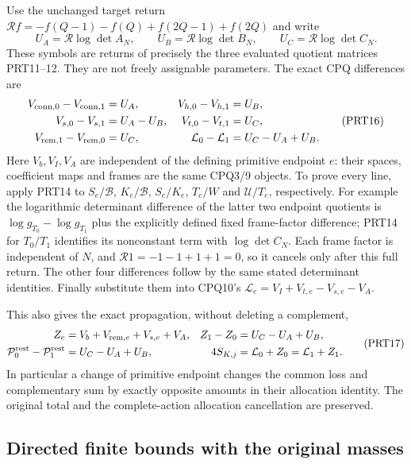 \documentclass[11pt,a4paper]{article}
\begin{document}
Use the unchanged target return
$\mathcal Rf=-f(Q-1)-f(Q)+f(2Q-1)+f(2Q)$ and write
\[
 U_A=\mathcal R\log\det A_N,\qquad
 U_B=\mathcal R\log\det B_N,\qquad
 U_C=\mathcal R\log\det C_N.
 \tag{PRT15}
\]
These symbols are returns of precisely the three evaluated quotient
matrices PRT11--12. They are not freely assignable parameters.
The exact CPQ differences are
\[
 \begin{aligned}
 V_{{\rm conn},0}-V_{{\rm conn},1}&=U_A,&
 V_{h,0}-V_{h,1}&=U_B,\\
 V_{s,0}-V_{s,1}&=U_A-U_B,&
 V_{t,0}-V_{t,1}&=U_C,\\
 V_{{\rm rem},1}-V_{{\rm rem},0}&=U_C,&
 \mathcal L_0-\mathcal L_1&=U_C-U_A+U_B.
 \end{aligned}\tag{PRT16}
\]
Here $V_b,V_I,V_A$ are independent of the defining primitive endpoint
$e$: their spaces, coefficient maps and frames are the same CPQ3/9
objects. To prove every line, apply PRT14 to
$S_e/\mathscr B$, $K_e/\mathscr B$, $S_e/K_e$, $T_e/W$ and
$\mathcal U/T_e$, respectively. For example the logarithmic
determinant difference of the latter two endpoint quotients is
$\log g_{T_0}-\log g_{T_1}$ plus the explicitly defined fixed
frame-factor difference; PRT14 for $T_0/T_1$ identifies its
nonconstant term with $\log\det C_N$.
Each frame factor is independent of $N$, and
$\mathcal R1=-1-1+1+1=0$, so it cancels only after this full return.
The other four differences follow by the same stated determinant
identities. Finally substitute them into CPQ10's
$\mathcal L_e=V_I+V_{t,e}-V_{s,e}-V_A$.

This also gives the exact propagation, without deleting a complement,
\[
 \begin{aligned}
 Z_e&=V_b+V_{{\rm rem},e}+V_{s,e}+V_A,
 &Z_1-Z_0&=U_C-U_A+U_B,\\
 \mathcal P^{\rm rest}_0-\mathcal P^{\rm rest}_1
    &=U_C-U_A+U_B,
 &4S_{K,j}&=\mathcal L_0+Z_0=\mathcal L_1+Z_1.
 \end{aligned}\tag{PRT17}
\]
In particular a change of primitive endpoint changes the common loss
and complementary sum by exactly opposite amounts in their allocation
identity. The original total and the complete-action allocation
cancellation are preserved.

\subsection{Directed finite bounds with the original masses}
\end{document}
